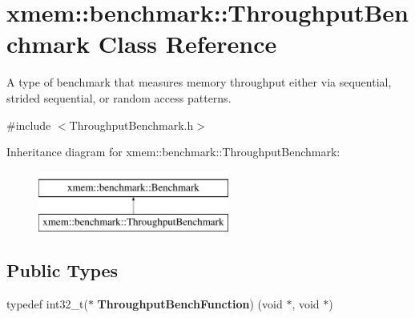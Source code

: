 \hypertarget{classxmem_1_1benchmark_1_1_throughput_benchmark}{}\section{xmem\+:\+:benchmark\+:\+:Throughput\+Benchmark Class Reference}
\label{classxmem_1_1benchmark_1_1_throughput_benchmark}


A type of benchmark that measures memory throughput either via sequential, strided sequential, or random access patterns.  




{\ttfamily \#include $<$Throughput\+Benchmark.\+h$>$}

Inheritance diagram for xmem\+:\+:benchmark\+:\+:Throughput\+Benchmark\+:\begin{figure}[H]
\begin{center}
\leavevmode
\includegraphics[height=2.000000cm]{classxmem_1_1benchmark_1_1_throughput_benchmark}
\end{center}
\end{figure}
\subsection*{Public Types}
\begin{DoxyCompactItemize}
\item 
\hypertarget{classxmem_1_1benchmark_1_1_throughput_benchmark_a21095b46866ebe68c75c3be14471a7b5}{}typedef int32\+\_\+t($\ast$ {\bfseries Throughput\+Bench\+Function}) (void $\ast$, void $\ast$)\label{classxmem_1_1benchmark_1_1_throughput_benchmark_a21095b46866ebe68c75c3be14471a7b5}

\end{DoxyCompactItemize}
